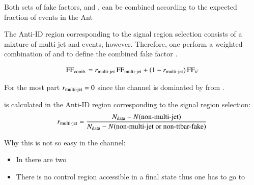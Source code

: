 Both sets of fake factors, \FFqcd and \FFttbar, can be combined
according to the expected fraction of \faketauhadvis events in the Ant


The Anti-ID region corresponding to the signal region selection
consists of a mixture of multi-jet and \ttbar events,
however. Therefore, one perform a weighted combination of \FFqcd and
\FFttbar to define the combined fake factor \FFcomb.

\begin{align*}
  \text{FF}_{\text{comb.}} = r_{\text{multi-jet}} \, \text{FF}_{\text{multi-jet}} + (1 - r_{\text{multi-jet}}) \, \text{FF}_{t\bar{t}}
\end{align*}

For the most part $r_{\text{multi-jet}} = 0$ since the \lephad channel is dominated
by \faketauhadvis from \ttbar.


\rqcd is calculated in the Anti-ID region corresponding to the signal region selection:
\begin{align*}
  r_{\text{multi-jet}} = \frac
  {N_{\text{data}} - N(\text{non-multi-jet})}
  {N_{\text{data}} - N(\text{non-multi-jet or non-ttbar-fake})}
\end{align*}


Why this is not so easy in the \hadhad channel:
\begin{itemize}
\item In \hadhad there are two \tauhadvis
\item There is no \ttbar control region accessible in a \hadhad final
  state thus one has to go to \lephad
\end{itemize}

